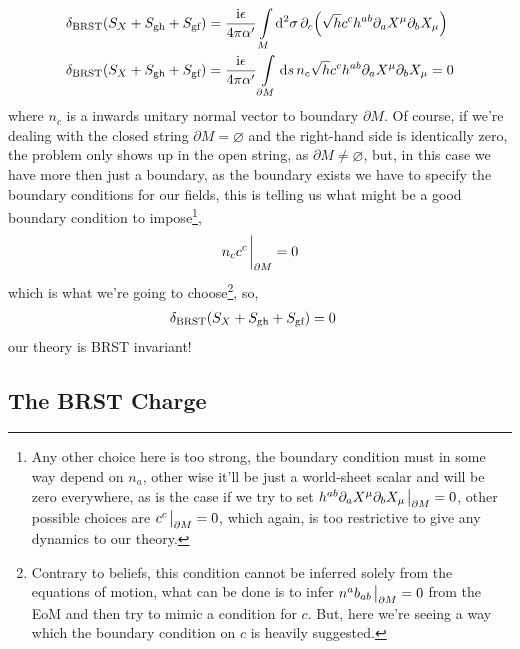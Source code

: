 \begin{align*}
    \delta_{\textnormal{BRST}}\qty(S_X+S_{\textnormal{gh}}+S_{\textnormal{gf}})&=\frac{\textnormal{i}\epsilon}{4\pi\alpha'}\int\limits_{M}\dd[2]{\sigma}\partial_c\qty(\sqrt{h}c^c h^{ab}\partial_aX^\mu \partial_bX_\mu)\\
    \delta_{\textnormal{BRST}}\qty(S_X+S_{\textnormal{gh}}+S_{\textnormal{gf}})&=\frac{\textnormal{i}\epsilon}{4\pi\alpha'}\int\limits_{\partial M}\dd{s}n_c\sqrt{h}c^c h^{ab}\partial_aX^\mu \partial_bX_\mu=0
\end{align*}
where $n_c$ is a inwards unitary normal vector to boundary $\partial M$. Of course, if we're dealing with the closed string $\partial M=\varnothing$ and the right-hand side is 
identically zero, the problem only shows up in the open string, as $\partial M\neq \varnothing$, but, in this case we have more then just a boundary, as the boundary exists we have to 
specify the boundary conditions for our fields, this is telling us what might be a good boundary condition to impose\footnote{Any other choice here is too strong, the boundary condition 
must in some way depend on $n_a$, other wise it'll be just a world-sheet scalar and will be zero everywhere, as is the case if we try to set $h^{ab}\partial_aX^\mu \partial_bX_\mu\eval_{\partial M}=0$, 
other possible choices are $c^c\eval_{\partial M}=0$, which again, is too restrictive to give any dynamics to our theory.}, $$n_cc^c\eval_{\partial M}=0$$which is what we're going to choose\footnote{Contrary to 
beliefs, this condition cannot be inferred solely from the equations of motion, what can be done is to infer $n^ab_{ab}\eval_{\partial M}=0$ from the EoM and then try to mimic a condition for $c$. But, 
here we're seeing a way which the boundary condition on $c$ is heavily suggested.}, so,
\begin{align*}
    \delta_{\textnormal{BRST}}\qty(S_X+S_{\textnormal{gh}}+S_{\textnormal{gf}})&=0
\end{align*}
our theory is BRST invariant!
\subsection{The BRST Charge}

